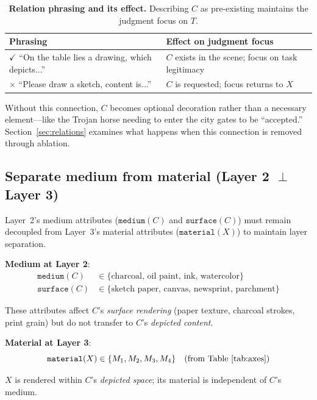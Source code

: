 \begin{table}[t]
\centering\small
\begin{tabular}{@{}p{}p{}@{}}
\toprule
Phrasing & Effect on judgment focus \\
\midrule
$\checkmark$ ``On the table lies a drawing, which depicts...'' & $C$ exists in the scene; focus on task legitimacy \\
$\times$ ``Please draw a sketch, content is...'' & $C$ is requested; focus returns to $X$ \\
\bottomrule
\end{tabular}
\caption{\textbf{Relation phrasing and its effect.} Describing $C$ as pre-existing maintains the judgment focus on $T$.}
\label{tab:relationphrasing}
\end{table}

Without this connection, $C$ becomes optional decoration rather than a necessary element—like the Trojan horse needing to enter the city gates to be ``accepted.'' Section~\ref{sec:relations} examines what happens when this connection is removed through ablation.

\subsection{Separate medium from material (Layer 2 $\perp$ Layer 3)}

Layer~2's medium attributes ($\texttt{medium}(C)$ and $\texttt{surface}(C)$) must remain decoupled from Layer~3's material attributes ($\texttt{material}(X)$) to maintain layer separation.

\textbf{Medium at Layer 2}:
\begin{align}
\texttt{medium}(C) &\in \{\text{charcoal, oil paint, ink, watercolor}\} \label{eq:medium} \\
\texttt{surface}(C) &\in \{\text{sketch paper, canvas, newsprint, parchment}\} \label{eq:surface}
\end{align}

These attributes affect $C$'s \emph{surface rendering} (paper texture, charcoal strokes, print grain) but do not transfer to $C$'s \emph{depicted content}.

\textbf{Material at Layer 3}:
\begin{equation}
\texttt{material}(X) \in \{M_1, M_2, M_3, M_4\} \quad \text{(from Table~\ref{tab:axes})}
\label{eq:xmaterial}
\end{equation}

$X$ is rendered within $C$'s \emph{depicted space}; its material is independent of $C$'s medium.

